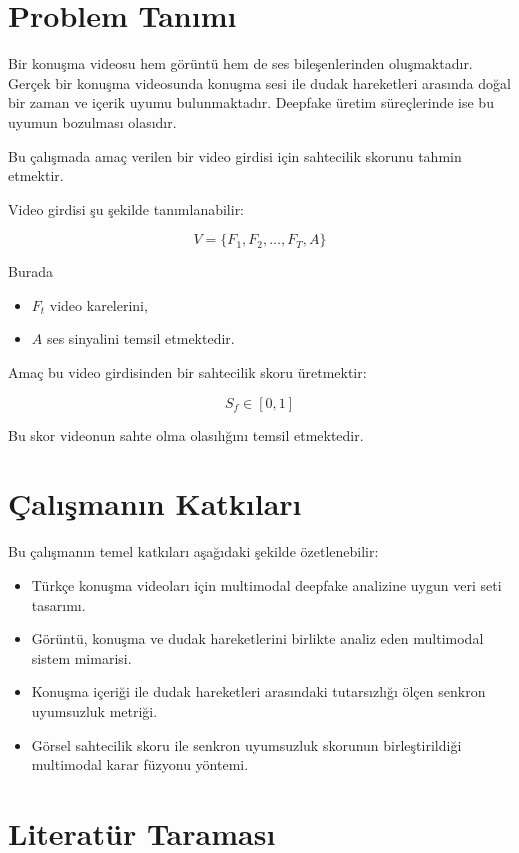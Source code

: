 \documentclass[conference]{IEEEtran}
\begin{document}
\section{Problem Tanımı}

Bir konuşma videosu hem görüntü hem de ses bileşenlerinden oluşmaktadır. Gerçek bir konuşma videosunda konuşma sesi ile dudak hareketleri arasında doğal bir zaman ve içerik uyumu bulunmaktadır. Deepfake üretim süreçlerinde ise bu uyumun bozulması olasıdır.

Bu çalışmada amaç verilen bir video girdisi için sahtecilik skorunu tahmin etmektir.

Video girdisi şu şekilde tanımlanabilir:

\[
V = \{F_1, F_2, \ldots, F_T, A\}
\]

Burada

\begin{itemize}
  \item $F_t$ video karelerini,
  \item $A$ ses sinyalini temsil etmektedir.
\end{itemize}

Amaç bu video girdisinden bir sahtecilik skoru üretmektir:

\[
S_f \in [0,1]
\]

Bu skor videonun sahte olma olasılığını temsil etmektedir.

\section{Çalışmanın Katkıları}

Bu çalışmanın temel katkıları aşağıdaki şekilde özetlenebilir:

\begin{itemize}
  \item Türkçe konuşma videoları için multimodal deepfake analizine uygun veri seti tasarımı.
  \item Görüntü, konuşma ve dudak hareketlerini birlikte analiz eden multimodal sistem mimarisi.
  \item Konuşma içeriği ile dudak hareketleri arasındaki tutarsızlığı ölçen senkron uyumsuzluk metriği.
  \item Görsel sahtecilik skoru ile senkron uyumsuzluk skorunun birleştirildiği multimodal karar füzyonu yöntemi.
\end{itemize}

\section{Literatür Taraması}
\end{document}
